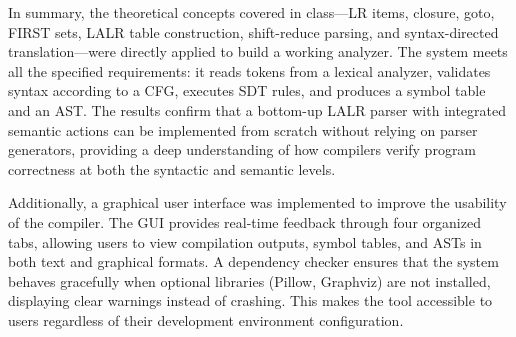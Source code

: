 \documentclass[letterpaper,12pt,oneside]{article}
\begin{document}
	\vspace{6pt}
	
	In summary, the theoretical concepts covered in class—LR items, closure, goto, FIRST sets, LALR table construction, shift-reduce parsing, and syntax-directed translation—were directly applied to build a working analyzer. The system meets all the specified requirements: it reads tokens from a lexical analyzer, validates syntax according to a CFG, executes SDT rules, and produces a symbol table and an AST. The results confirm that a bottom-up LALR parser with integrated semantic actions can be implemented from scratch without relying on parser generators, providing a deep understanding of how compilers verify program correctness at both the syntactic and semantic levels.
	
	\vspace{6pt}
	
	Additionally, a graphical user interface was implemented to improve the usability of the compiler. The GUI provides real-time feedback through four organized tabs, allowing users to view compilation outputs, symbol tables, and ASTs in both text and graphical formats. A dependency checker ensures that the system behaves gracefully when optional libraries (Pillow, Graphviz) are not installed, displaying clear warnings instead of crashing. This makes the tool accessible to users regardless of their development environment configuration.

\printbibliography
\end{document}
